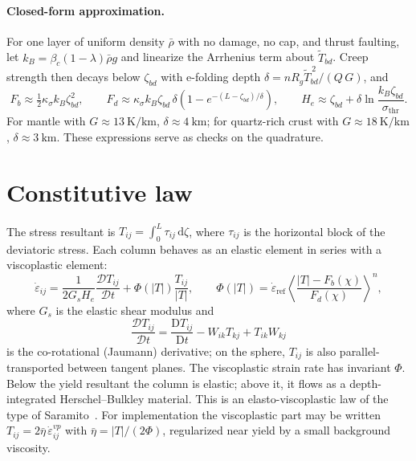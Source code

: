 \documentclass[11pt]{article}
\newcommand{\dd}{\,\mathrm{d}}
\newcommand{\mac}[1]{\left\langle #1 \right\rangle}
\newcommand{\inv}[1]{\left| #1 \right|}
\newcommand{\Tk}{\tilde{T}}
\begin{document}
\paragraph{Closed-form approximation.}
For one layer of uniform density $\bar\rho$ with no damage, no cap, and thrust
faulting, let $k_B = \beta_c(1-\lambda)\bar\rho g$ and linearize the Arrhenius
term about $\Tk_{bd}$. Creep strength then decays below $\zeta_{bd}$ with
e-folding depth $\delta = nR_g\Tk_{bd}^{\,2}/(Q\,G)$, and
\begin{equation}
  F_b \approx \tfrac12\kappa_\sigma k_B\zeta_{bd}^2,
  \qquad
  F_d \approx \kappa_\sigma k_B\zeta_{bd}\,\delta
  \left(1 - e^{-(L-\zeta_{bd})/\delta}\right),
  \qquad
  H_e \approx \zeta_{bd} + \delta\ln\frac{k_B\zeta_{bd}}{\sigma_{\mathrm{thr}}}.
\end{equation}
For mantle with $G\approx\SI{13}{\kelvin\per\kilo\metre}$, $\delta\approx
\SI{4}{\kilo\metre}$; for quartz-rich crust with
$G\approx\SI{18}{\kelvin\per\kilo\metre}$, $\delta\approx\SI{3}{\kilo\metre}$.
These expressions serve as checks on the quadrature.

\section{Constitutive law}
\label{sec:constitutive}

The stress resultant is $T_{ij} = \int_0^L \tau_{ij}\dd\zeta$, where $\tau_{ij}$
is the horizontal block of the deviatoric stress. Each column behaves as an
elastic element in series with a viscoplastic element:
\begin{equation}
  \dot\varepsilon_{ij}
  = \frac{1}{2G_sH_e}\frac{\mathcal{D}T_{ij}}{\mathcal{D}t}
  + \Phi\!\left(\inv{T}\right)\frac{T_{ij}}{\inv{T}},
  \qquad
  \Phi\!\left(\inv{T}\right) = \dot\varepsilon_{\mathrm{ref}}
  \mac{\frac{\inv{T} - F_b(\chi)}{F_d(\chi)}}^{n},
  \label{eq:evp}
\end{equation}
where $G_s$ is the elastic shear modulus and
\begin{equation}
  \frac{\mathcal{D}T_{ij}}{\mathcal{D}t}
  = \frac{\mathrm{D}T_{ij}}{\mathrm{D}t} - W_{ik}T_{kj} + T_{ik}W_{kj}
\end{equation}
is the co-rotational (Jaumann) derivative; on the sphere, $T_{ij}$ is also
parallel-transported between tangent planes. The viscoplastic strain rate has
invariant $\Phi$. Below the yield resultant the column is elastic; above it, it
flows as a depth-integrated Herschel--Bulkley material. This is an
elasto-viscoplastic law of the type of Saramito~\cite{Saramito2009}. For
implementation the viscoplastic part may be written
$T_{ij} = 2\bar\eta\,\dot\varepsilon^{vp}_{ij}$ with
$\bar\eta = \inv{T}/(2\Phi)$, regularized near yield by a small background
viscosity.
\end{document}
